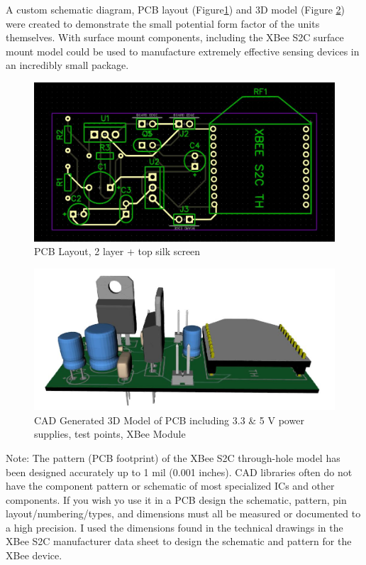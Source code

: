 	\par A custom schematic diagram, PCB layout (Figure\ref{fig:pcb}) and 3D model (Figure \ref{fig:3dmodel}) were created to demonstrate the small potential form factor of the units themselves. With surface mount components, including the XBee S2C surface mount model could be used to manufacture extremely effective sensing devices in an incredibly small package.

	\begin{figure}[h]
		\centering
		\includegraphics[width=0.75\linewidth]{power supply pcb w xbee.JPG}
		\caption{PCB Layout, 2 layer + top silk screen}
		\label{fig:pcb}
	\end{figure}
	\begin{figure}[h]
	\centering
		\includegraphics[width=0.75\linewidth]{3dmodel.JPG}
		\caption{CAD Generated 3D Model of PCB including 3.3 \& 5 V power supplies, test points, XBee Module}
		\label{fig:3dmodel}
	\end{figure}
	
	\par Note: The pattern (PCB footprint) of the XBee S2C through-hole model has been designed accurately up to 1 mil (0.001 inches). CAD libraries often do not have the component pattern or schematic of most specialized ICs and other components. If you wish yo use it in a PCB design the schematic, pattern, pin layout/numbering/types, and dimensions must all be measured or documented to a high precision. I used the dimensions found in the technical drawings in the XBee S2C manufacturer data sheet to design the schematic and pattern for the XBee device. 


	
	